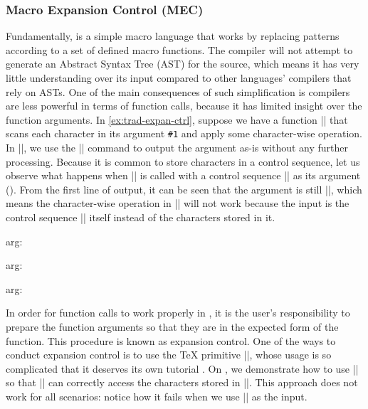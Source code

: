 \documentclass{ltugboat}
\begin{document}
\subsubsection{Macro Expansion Control (MEC)}\label{sec:intro-macro-expansion-control}
Fundamentally, \LT{} is a simple macro language that works by replacing patterns according to a set of defined macro functions.
The \LT{} compiler will not attempt to generate an Abstract Syntax Tree (AST) for the \LT{} source, which means it has very little understanding over its input compared to other languages' compilers that rely on ASTs.
One of the main consequences of such simplification is \LT{} compilers are less powerful in terms of function calls, because it has limited insight over the function arguments.
In \cref{ex:trad-expan-ctrl}, suppose we have a function \inltex|\cmda| that scans each character in its argument \verb|#1| and apply some character-wise operation. 
In \inltex|\cmda|, we use the \inltex|\detokenize| command to output the argument as-is without any further processing.
Because it is common to store characters in a control sequence, let us observe what happens when \inltex|\cmda| is called with a control sequence \inltex|\vala| as its argument ().
From the first line of output, it can be seen that the argument is still \inltex|\vala|, which means the character-wise operation in \inltex|\cmda| will not work because the input is the control sequence \inltex|\cmda| itself instead of the characters stored in it.
\begin{latexsample}[examplelabel=ex:trad-expan-ctrl,exampletitle={Expansion Control},noexport]
\def\cmda#1{%
  arg: \detokenize{#1} %
}
\def\vala{val-a}
\def\valb{\vala}
\par\cmda{\vala}
\par\expandafter\expandafter\expandafter\cmda\expandafter{\vala}
\par\expandafter\expandafter\expandafter\cmda\expandafter{\valb}
\end{latexsample}
\noindent In order for function calls to work properly in \LT{}, it is the user's responsibility to prepare the function arguments so that they are in the expected form of the function.
This procedure is known as expansion control.
One of the ways to conduct expansion control is to use the \TeX{} primitive \inltex|\expandafter|, whose usage is so complicated that it deserves its own tutorial \cite{bechtolsheim1988tutorial}.
On , we demonstrate how to use \inltex|\expandafter| so that \inltex|\cmda| can correctly access the characters stored in \inltex|\vala|.
This approach does not work for all scenarios: notice how it fails when we use \inltex|\valb| as the input.
\end{document}

